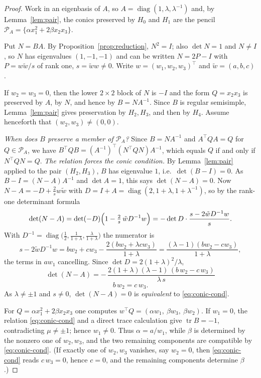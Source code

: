 \documentclass[11pt,a4paper]{article}
\theoremstyle{plain}
\theoremstyle{definition}
\theoremstyle{remark}
\begin{document}
\begin{proof}
Work in an eigenbasis of $A$, so $A=\operatorname{diag}(1,\lambda,\lambda^{-1})$
and, by Lemma~\ref{lem:pair}, the conics preserved by $H_0$ and $H_1$ are the
pencil $\mathcal{P}_A=\{\alpha x_1^2+2\beta x_2x_3\}$.

Put $N=BA$. By Proposition~\ref{prop:reduction}, $N^2=I$; also $\det N=1$ and
$N\neq I$, so $N$ has eigenvalues $(1,-1,-1)$ and can be written $N=2P-I$ with
$P=w\tilde w/s$ of rank one, $s=\tilde ww\neq0$. Write $w=(w_1,w_2,w_3)^\top$ and
$\tilde w=(a,b,c)$.

If $w_2=w_3=0$, then the lower $2\times2$ block of $N$ is $-I$ and the form
$Q=x_2x_3$ is preserved by $A$, by $N$, and hence by $B=NA^{-1}$. Since $B$ is
regular semisimple, Lemma~\ref{lem:pair} gives preservation by $H_2,H_3$, and then
by $H_4$. Assume henceforth that $(w_2,w_3)\neq(0,0)$.

\emph{When does $B$ preserve a member of $\mathcal{P}_A$?} Since $B=NA^{-1}$ and
$A^\top QA=Q$ for $Q\in\mathcal{P}_A$, we have $B^\top QB=(A^{-1})^\top(N^\top
QN)A^{-1}$, which equals $Q$ if and only if $N^\top QN=Q$.
\emph{The relation forces the conic condition.} By Lemma~\ref{lem:pair} applied
to the pair $(H_2,H_3)$, $B$ has eigenvalue $1$, i.e.\ $\det(B-I)=0$. As
$B-I=(N-A)A^{-1}$ and $\det A=1$, this says $\det(N-A)=0$. Now $N-A=-D+\frac2s
w\tilde w$ with $D=I+A=\operatorname{diag}(2,1+\lambda,1+\lambda^{-1})$, so by the
rank-one determinant formula
\[
  \det(N-A)=\det(-D)\Bigl(1-\tfrac2s\,\tilde wD^{-1}w\Bigr)
           =-\det D\cdot\frac{s-2\tilde wD^{-1}w}{s}.
\]
With $D^{-1}=\operatorname{diag}\bigl(\tfrac12,\tfrac1{1+\lambda},
\tfrac{\lambda}{1+\lambda}\bigr)$ the numerator is
\[
  s-2\tilde wD^{-1}w
  =bw_2+cw_3-\frac{2(bw_2+\lambda cw_3)}{1+\lambda}
  =\frac{(\lambda-1)(bw_2-cw_3)}{1+\lambda},
\]
the terms in $aw_1$ cancelling. Since $\det D=2(1+\lambda)^2/\lambda$,
\[
  \boxed{\ \det(N-A)=-\,\frac{2(1+\lambda)(\lambda-1)\,(b\,w_2-c\,w_3)}{\lambda\,s}\ }
\]
\begin{equation}\label{eq:conic-cond}
  b\,w_2=c\,w_3 .
\end{equation}
As $\lambda\neq\pm1$ and $s\neq0$, $\det(N-A)=0$ is \emph{equivalent} to
\eqref{eq:conic-cond}.

For $Q=\alpha x_1^2+2\beta x_2x_3$ one computes
$w^\top Q=(\alpha w_1,\ \beta w_3,\ \beta w_2)$. If $w_1=0$, the relation
\eqref{eq:conic-cond} and a direct trace calculation give
$\operatorname{tr}B=-1$, contradicting $\mu\neq\pm1$; hence $w_1\neq0$.
Thus $\alpha=a/w_1$, while $\beta$ is determined by the nonzero one of $w_2,w_3$,
and the two remaining components are compatible by \eqref{eq:conic-cond}.
(If exactly one of $w_2,w_3$ vanishes, say $w_2=0$, then \eqref{eq:conic-cond}
reads $c\,w_3=0$, hence $c=0$, and the remaining components determine $\beta$.)


\end{proof}
\end{document}
